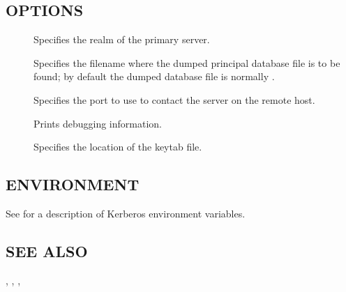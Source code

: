 \documentclass[letterpaper,10pt,english]{sphinxmanual}
\begin{document}
\subsection{OPTIONS}
\label{\detokenize{admin/admin_commands/kprop:options}}\begin{description}
\item[{ }] \leavevmode
\sphinxAtStartPar
Specifies the realm of the primary server.

\item[{ }] \leavevmode
\sphinxAtStartPar
Specifies the filename where the dumped principal database file is
to be found; by default the dumped database file is normally
{\hyperref[\detokenize{mitK5defaults:paths}]{}}.

\item[{ }] \leavevmode
\sphinxAtStartPar
Specifies the port to use to contact the {\hyperref[\detokenize{admin/admin_commands/kpropd:kpropd-8}]{}} server
on the remote host.

\item[{}] \leavevmode
\sphinxAtStartPar
Prints debugging information.

\item[{ }] \leavevmode
\sphinxAtStartPar
Specifies the location of the keytab file.

\end{description}


\subsection{ENVIRONMENT}
\label{\detokenize{admin/admin_commands/kprop:environment}}
\sphinxAtStartPar
See  for a description of Kerberos environment
variables.


\subsection{SEE ALSO}
\label{\detokenize{admin/admin_commands/kprop:see-also}}
\sphinxAtStartPar
{\hyperref[\detokenize{admin/admin_commands/kpropd:kpropd-8}]{}}, {\hyperref[\detokenize{admin/admin_commands/kdb5_util:kdb5-util-8}]{}}, {\hyperref[\detokenize{admin/admin_commands/krb5kdc:krb5kdc-8}]{}},
\end{document}
